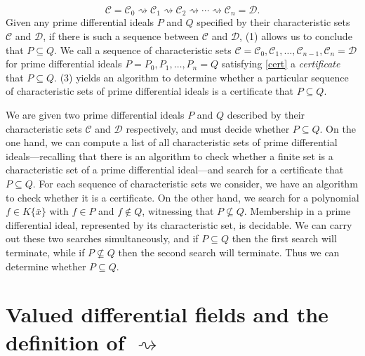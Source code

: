 \documentclass[12pt]{amsart}
\theoremstyle{definition}
\numberwithin{subcase}{cases}
\theoremstyle{remark}
\newcommand{\mc}[1]{\mathcal{#1}}
\begin{document}
\[ \mc{C} = \mc{C}_0 \rightsquigarrow \mc{C}_1 \rightsquigarrow \mc{C}_2 \rightsquigarrow \cdots \rightsquigarrow \mc{C}_n = \mc{D}. \tag{$*$}\label{cert}\]
Given any prime differential ideals $P$ and $Q$ specified by their characteristic sets $\mc{C}$ and $\mc{D}$, if there is such a sequence between $\mc{C}$ and $\mc{D}$, (1) allows us to conclude that $P \subseteq Q$. We call a sequence of characteristic sets $\mc{C} = \mc{C}_0,\mc{C}_1,\ldots,\mc{C}_{n-1},\mc{C}_n = \mc{D}$ for prime differential ideals $P = P_0,P_1,\ldots,P_n = Q$ satisfying \eqref{cert} a \textit{certificate} that $P \subseteq Q$.  (3) yields an algorithm to determine whether a particular sequence of characteristic sets of prime differential ideals is a certificate that $P \subseteq Q$.

We are given two prime differential ideals $P$ and $Q$ described by their characteristic sets $\mc{C}$ and $\mc{D}$ respectively, and must decide whether $P \subseteq Q$. On the one hand, we can compute a list of all characteristic sets of prime differential ideals---recalling that there is an algorithm to check whether a finite set is a characteristic set of a prime differential ideal---and search for a certificate that $P \subseteq Q$. For each sequence of characteristic sets we consider, we have an algorithm to check whether it is a certificate. On the other hand, we search for a polynomial $f \in K\{\bar{x}\}$ with $f \in P$ and $f \notin Q$, witnessing that $P \nsubseteq Q$. Membership in a prime differential ideal, represented by its characteristic set, is decidable. We can carry out these two searches simultaneously, and if $P \subseteq Q$ then the first search will terminate, while if $P \nsubseteq Q$ then the second search will terminate. Thus we can determine whether $P \subseteq Q$.

\section{Valued differential fields and the definition of $\rightsquigarrow$}\label{sec:def-arrow}
\end{document}
